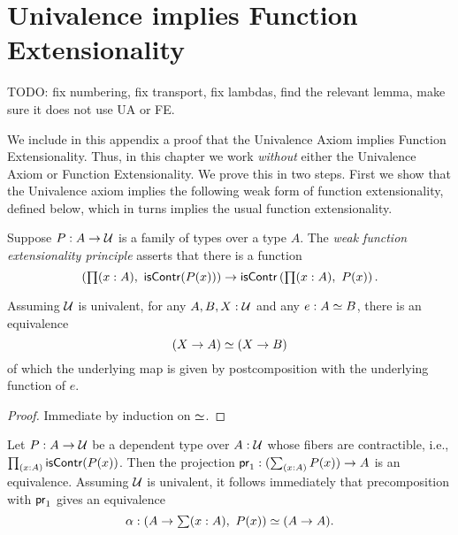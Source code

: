 \chapter{Univalence implies Function Extensionality}


TODO: fix numbering, fix transport, fix lambdas, find the relevant lemma, make sure it does not use UA or FE.

We include in this appendix a proof that the Univalence Axiom implies Function
Extensionality. Thus, in this chapter we work \emph{without} either the Univalence Axiom
or Function Extensionality. We prove this in two steps. First we show that the Univalence
axiom implies the following weak form of function extensionality, defined below, which in turns implies the usual function extensionality.

\begin{defn}
Suppose $P : A \to \mathcal{U}$ is a family of types over a type $A$. The \emph{weak function extensionality principle} asserts that there is a function
\begin{equation*}
\left(\prd{x:A}\iscontr(P(x))\right)
  \to\iscontr \left(\prd{x:A}P(x)\right).
\end{equation*}
\end{defn}

\begin{lem} \label{UA-eqv-hom-eqv}
Assuming $\mathcal{U}$ is univalent, for any $A,B,X:\mathcal{U}$ and any $e:A \simeq B$, there is an equivalence
\begin{equation*}
(X\to A) \simeq (X\to B)
\end{equation*}
of which the underlying map is given by postcomposition with the underlying function of $e$.
\end{lem}

\begin{proof}
Immediate by induction on $ \simeq $. 
\end{proof}

\begin{cor}
Let $P:A\to\mathcal{U}$ be a dependent type over $A:\mathcal{U}$ whose fibers are contractible, i.e., $\prd{x:A}\iscontr(P(x))$.
Then the projection $\proj{1}:(\sm{x:A}P(x))\to A$ is an equivalence. Assuming $\mathcal{U}$ is univalent, it follows immediately that precomposition with $\mathsf{pr}_{1}$ gives an equivalence
\begin{equation*}
\alpha : \eqv{(A\to\sm{x:A}P(x))}{(A\to A)}.
\end{equation*}
\end{cor}

